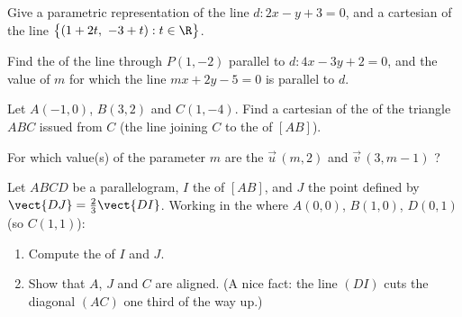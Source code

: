 \begin{exercise}[$\star\star$]\label{exo:g11:vect:7}
Give a parametric representation of the line $d: 2x - y + 3 = 0$, and a
cartesian  of the line
$\bigl\{(1 + 2t,\ -3 + t) : t \in \R\bigr\}$.
\end{exercise}

\begin{exercise}[$\star\star$]\label{exo:g11:vect:8}
Find the  of the line through $P(1, -2)$ parallel to
$d: 4x - 3y + 2 = 0$, and the value of $m$ for which the line
$mx + 2y - 5 = 0$ is parallel to $d$.
\end{exercise}

\begin{exercise}[$\star\star$]\label{exo:g11:vect:9}
Let $A(-1, 0)$, $B(3, 2)$ and $C(1, -4)$. Find a cartesian  of the
\emph{} of the triangle $ABC$ issued from $C$ (the line joining $C$
to the  of $[AB]$).
\end{exercise}

\begin{exercise}[$\star\star$]\label{exo:g11:vect:10}
For which value(s) of the parameter $m$ are the 
$\vec u\,(m, 2)$ and $\vec v\,(3, m - 1)$ ?
\end{exercise}

\begin{exercise}[$\star\star\star$]\label{exo:g11:vect:11}
Let $ABCD$ be a parallelogram, $I$ the  of $[AB]$, and $J$ the
point defined by $\vect{DJ} = \frac23 \vect{DI}$. Working in the
 where $A(0,0)$, $B(1,0)$, $D(0,1)$ (so $C(1,1)$):
\begin{enumerate}
  \item Compute the  of $I$ and $J$.
  \item Show that $A$, $J$ and $C$ are aligned. (A nice fact: the line
        $(DI)$ cuts the diagonal $(AC)$ one third of the way up.)
\end{enumerate}
\end{exercise}
